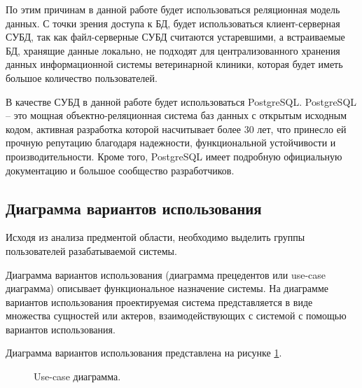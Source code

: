 \documentclass[a4paper,14pt]{article}
\begin{document}
По этим причинам в данной работе будет использоваться реляционная модель данных. С точки зрения доступа к БД, будет использоваться клиент-серверная СУБД, так как файл-серверные СУБД считаются устаревшими, а встраиваемые БД, хранящие данные локально, не подходят для централизованного хранения данных информационной системы ветеринарной клиники, которая будет иметь большое количество пользователей.

В качестве СУБД в данной работе будет использоваться PostgreSQL. PostgreSQL -- это мощная объектно-реляционная система баз данных с открытым исходным кодом, активная разработка которой насчитывает более 30 лет, что принесло ей прочную репутацию благодаря надежности, функциональной устойчивости и производительности. Кроме того, PostgreSQL имеет подробную официальную документацию и большое сообщество разработчиков.

\subsection{Диаграмма вариантов использования}

Исходя из анализа предментой области, необходимо выделить группы пользователей разабатываемой системы.

Диаграмма вариантов использования (диаграмма прецедентов или use-case диаграмма) описывает функциональное назначение системы. На диаграмме вариантов использования проектируемая система представляется в виде множества сущностей или актеров, взаимодействующих с системой с помощью вариантов использования.

Диаграмма вариантов использования представлена на рисунке \ref{fig:use_case}.

\begin{figure}[!h]
	\caption{Use-case диаграмма.}
	\label{fig:use_case}
\end{figure}
\end{document}
